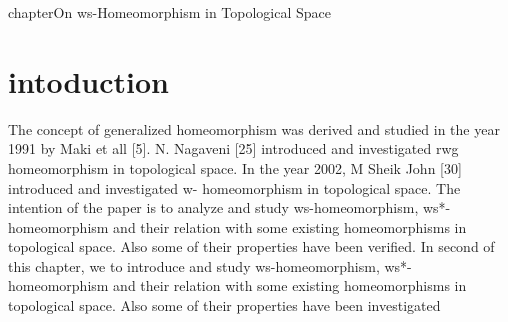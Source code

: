 chapter{On ws-Homeomorphism in Topological Space}
\ifpdf
\graphicspath{{Chapter2/Chapter2Figs/}}
\else
\graphicspath{{Chapter2/Chapter2Figs/EPS/}{Chapter2/Chapter2Figs/}}
\fi

\parindent 0.75cm
\parskip 0.25cm

\newtheorem{theorem}{Theorem}[section]
\theoremstyle{plain}
\newtheorem{acknowledgement}{Acknowledgement}
\newtheorem{algorithm}{Algorithm}[section]
\newtheorem{axiom}{Axiom}[section]
\newtheorem{case}{Case}[section]
\newtheorem{claim}{Claim}[section]
\newtheorem{conclusion}{Conclusion}[section]
\newtheorem{condition}{Condition}[section]
\newtheorem{conjecture}{Conjecture}[section]
\newtheorem{corollary}[theorem]{Corollary}
\newtheorem{criterion}{Criterion}[section]
\newtheorem{definition}{Definition}[section]
\newtheorem{example}{Example}[section]
\newtheorem{exercise}{Exercise}[section]
\newtheorem{lemma}{Lemma}[section]
\newtheorem{notation}{Notation}[section]
\newtheorem{problem}{Problem}[section]
\newtheorem{proposition}{Proposition}[section]
\newtheorem{remark}[theorem]{Remark}
\newtheorem{solution}{Solution}[section]
\newtheorem{summary}{Summary}[section]
\def\baselinestretch{1.5}
\section{intoduction}
The concept of generalized homeomorphism was derived and studied in the year 1991 by Maki et all [5]. N. Nagaveni [25] introduced and investigated rwg homeomorphism in topological space. In the year 2002, M Sheik John [30] introduced and investigated w- homeomorphism in topological space. The intention of the paper is to analyze and study ws-homeomorphism, ws*-homeomorphism and their relation with some existing homeomorphisms in topological space. Also some of their properties have been verified.
In second of this chapter, we to introduce and study ws-homeomorphism, ws*-homeomorphism and their relation with some existing homeomorphisms in topological space. Also some of their properties have been investigated
